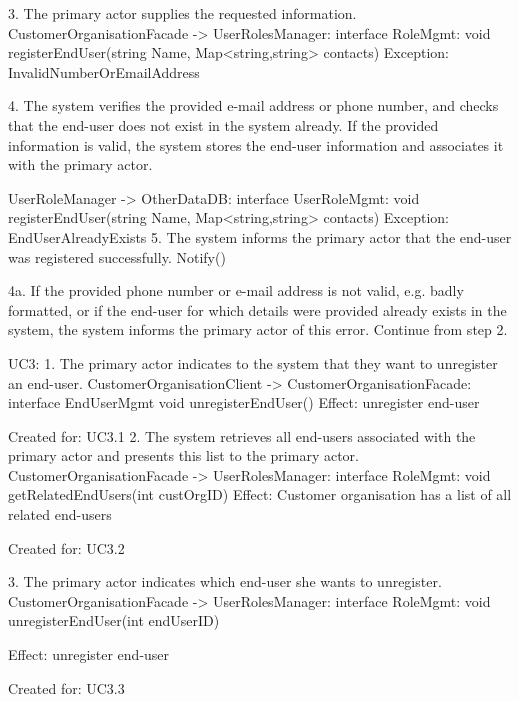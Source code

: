         3. The primary actor supplies the requested information.
            CustomerOrganisationFacade -> UserRolesManager: interface RoleMgmt: void registerEndUser(string Name, Map<string,string> contacts)
            Exception: InvalidNumberOrEmailAddress

        4. The system verifies the provided e-mail address or phone number, and checks that the end-user
            does not exist in the system already. If the provided information is valid, the system stores
            the end-user information and associates it with the primary actor.

                UserRoleManager -> OtherDataDB: interface UserRoleMgmt: void registerEndUser(string Name, Map<string,string> contacts)
                Exception: EndUserAlreadyExists
        5. The system informs the primary actor that the end-user was registered successfully.
                Notify()

        4a. If the provided phone number or e-mail address is not valid, e.g. badly formatted, or if the
            end-user for which details were provided already exists in the system, the system informs the
            primary actor of this error. Continue from step 2.

    UC3:
        1. The primary actor indicates to the system that they want to unregister an end-user.
            CustomerOrganisationClient -> CustomerOrganisationFacade: interface EndUserMgmt
                                            void unregisterEndUser()
            Effect: unregister end-user
            \item Created for: UC3.1
        2. The system retrieves all end-users associated with the primary actor and presents this list to
            the primary actor.
            CustomerOrganisationFacade -> UserRolesManager: interface RoleMgmt:
                                                void getRelatedEndUsers(int custOrgID)
            Effect: Customer organisation has a list of all related end-users
            \item Created for: UC3.2

        3. The primary actor indicates which end-user she wants to unregister.
             CustomerOrganisationFacade -> UserRolesManager: interface RoleMgmt:
                                                void unregisterEndUser(int endUserID)

            Effect: unregister end-user
            \item Created for: UC3.3

